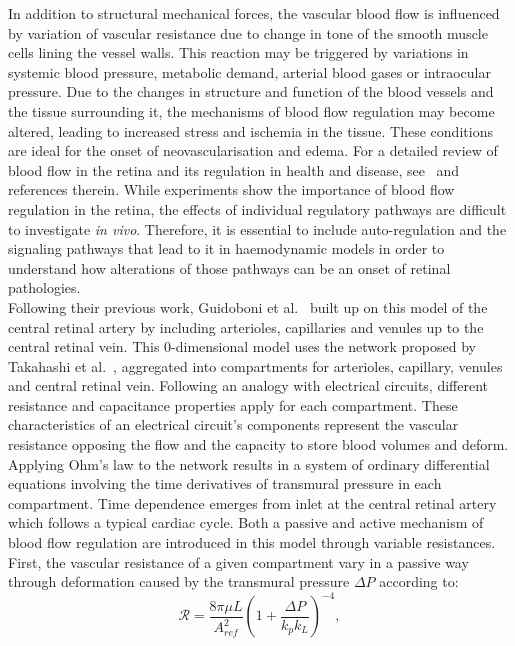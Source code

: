 \documentclass[12pt,a4paper]{article}
\begin{document}
In addition to structural mechanical forces, the vascular blood flow is influenced by variation of vascular resistance due to change in tone of the smooth muscle cells lining the vessel walls.
This reaction may be triggered by variations in systemic blood pressure, metabolic demand, arterial blood gases or intraocular pressure.
Due to the changes in structure and function of the blood vessels and the tissue surrounding it, the mechanisms of blood flow regulation may become altered, leading to increased stress and ischemia in the tissue.
These conditions are ideal for the onset of neovascularisation and edema.
For a detailed review of blood flow in the retina and its regulation in health and disease, see~\cite{Pournaras_2008} and references therein.
While experiments show the importance of blood flow regulation in the retina, the effects of individual regulatory pathways are difficult to investigate \textit{in vivo}. 
Therefore, it is essential to include auto-regulation and the signaling pathways that lead to it in haemodynamic models in order to understand how alterations of those pathways can be an onset of retinal pathologies.\\
Following their previous work, Guidoboni et al.~\cite{Guidoboni_2014b} built up on this model of the central retinal artery by including arterioles, capillaries and venules up to the central retinal vein.
This 0-dimensional model uses the network proposed by Takahashi et al.~\cite{Takahashi_2009}, aggregated into compartments for arterioles, capillary, venules and central retinal vein.
Following an analogy with electrical circuits, different resistance and capacitance properties apply for each compartment.
These characteristics of an electrical circuit's components represent the vascular resistance opposing the flow and the capacity to store blood volumes and deform.
Applying Ohm's law to the network results in a system of ordinary differential equations involving the time derivatives of transmural pressure in each compartment.
Time dependence emerges from inlet at the central retinal artery which follows a typical cardiac cycle.
Both a passive and active mechanism of blood flow regulation are introduced in this model through variable resistances.
First, the vascular resistance of a given compartment vary in a passive way through deformation caused by the transmural pressure $\Delta P$ according to:
\begin{equation*}
  \label{eq:PassiveVariableResistance}
  \mathcal{R} = \frac{8\pi\mu L}{A^2_{ref}}\left(1+\frac{\Delta P}{k_pk_L}\right)^{-4},
\end{equation*}
\end{document}
